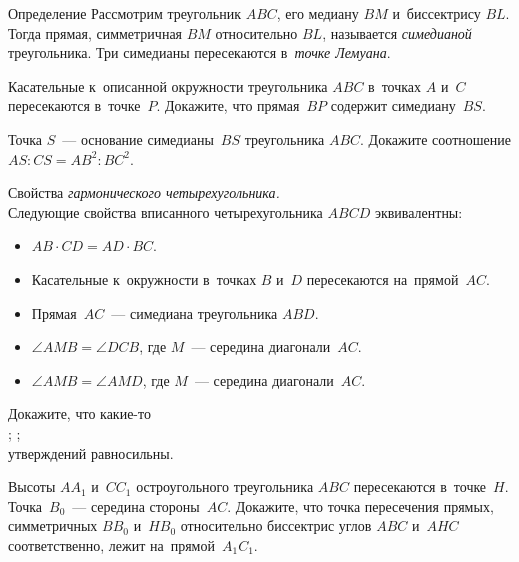 


\begin{claim}{Определение}
Рассмотрим треугольник $ABC$, его медиану $BM$ и~биссектрису $BL$.
Тогда прямая, симметричная $BM$ относительно $BL$, называется \emph{симедианой}
треугольника.
Три симедианы пересекаются в~\emph{точке Лемуана}.
\end{claim}

\begin{problems}

\item
Касательные к~описанной окружности треугольника $ABC$ в~точках $A$ и~$C$
пересекаются в~точке~$P$.
Докажите, что прямая~$BP$ содержит симедиану~$BS$.

\item
Точка $S$~--- основание симедианы~$BS$ треугольника $ABC$.
Докажите соотношение $AS : CS = AB^2 : BC^2$.

\item
Свойства \emph{гармонического четырехугольника.}
\\
Следующие свойства вписанного четырехугольника $ABCD$ эквивалентны:
\begin{itemize}
    \item
    $AB \cdot CD = AD \cdot BC$.
    \item
    Касательные к~окружности в~точках $B$ и~$D$ пересекаются на~прямой~$AC$.
    \item
    Прямая~$AC$~--- симедиана треугольника $ABD$.
    \item
    $\angle AMB = \angle DCB$, где $M$~--- середина диагонали~$AC$.
    \item
    $\angle AMB = \angle AMD$, где $M$~--- середина диагонали~$AC$.
\end{itemize}
Докажите, что какие-то
\\
;
\qquad
{};
\qquad
{}
\\
утверждений равносильны.

\item
Высоты $AA_{1}$ и~$CC_{1}$ остроугольного треугольника $ABC$ пересекаются
в~точке~$H$.
Точка~$B_{0}$~--- середина стороны~$AC$.
Докажите, что точка пересечения прямых, симметричных $BB_{0}$ и~$HB_{0}$
относительно биссектрис углов $ABC$ и~$AHC$ соответственно, лежит
на~прямой~$A_{1}C_{1}$.


\end{problems}
